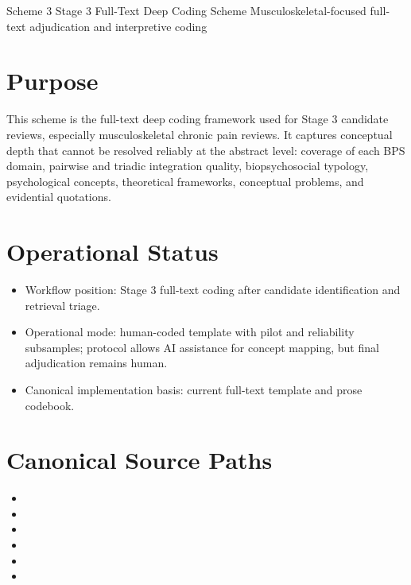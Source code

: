 \documentclass[11pt]{article}
\begin{document}
\schemeheader
  {Scheme 3}
  {Stage 3 Full-Text Deep Coding Scheme}
  {Musculoskeletal-focused full-text adjudication and interpretive coding}

\section*{Purpose}
This scheme is the full-text deep coding framework used for Stage 3 candidate reviews, especially musculoskeletal chronic pain reviews. It captures conceptual depth that cannot be resolved reliably at the abstract level: coverage of each BPS domain, pairwise and triadic integration quality, biopsychosocial typology, psychological concepts, theoretical frameworks, conceptual problems, and evidential quotations.

\section*{Operational Status}
\begin{itemize}
\item Workflow position: Stage 3 full-text coding after candidate identification and retrieval triage.
\item Operational mode: human-coded template with pilot and reliability subsamples; protocol allows AI assistance for concept mapping, but final adjudication remains human.
\item Canonical implementation basis: current full-text template and prose codebook.
\end{itemize}

\section*{Canonical Source Paths}
\begin{itemize}
\item {}
\item {}
\item {}
\item {}
\item {}
\item {}
\end{itemize}
\end{document}
